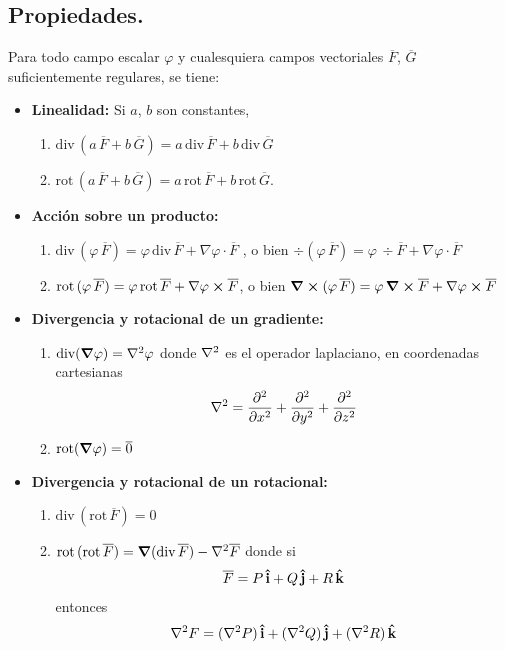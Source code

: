 \documentclass[hidelinks,12pt]{article}
\begin{document}
\subsection{Propiedades.}
Para todo campo escalar $\varphi$ y cualesquiera campos vectoriales $\overline{F}$, $\overline{G}$ suficientemente regulares, se tiene:
\begin{itemize}
\item \textbf{Linealidad:} Si $a$, $b$ son constantes,
\begin{enumerate}[label=(\roman*)]
\item  $\text{div} \, (a \, \overline{F} + b \, \overline{G}) = a \, \text{div} \, \overline{F} + b \, \text{div} \, \overline{G}$
\item $\text{rot} \, (a \, \overline{F} + b \, \overline{G}) = a \, \text{rot} \, \overline{F} + b \, \text{rot}  \, \overline{G}.$
\end{enumerate}
\item \textbf{Acción sobre un producto:}
\begin{enumerate}[label=(\roman*)]
\item  $\text{div} \, (\varphi \, \overline{F}) = \varphi \,  \text{div} \, \overline{F} + \nabla \varphi \cdot \overline{F}$ , o bien $\div{(\varphi \, \overline{F} )} = \varphi \, \div{\overline{F}} +  \nabla \varphi \cdot \overline{F}$
\item $\text{rot} \, (\varphi \, \overline{F}) = \varphi \, \text{rot} \, \overline{F} + \nabla \varphi \cp \overline{F}$, o bien $\curl{(\varphi \, \overline{F})} = \varphi \, \curl{\overline{F}} + \nabla \varphi \cp \overline{F}$
\end{enumerate}
\item \textbf{Divergencia y rotacional de un gradiente:}
\begin{enumerate}[label=(\roman*)]
\item $\text{div} (\gradient{\varphi}) = \laplacian{\varphi}$ donde $\laplacian$ es el operador laplaciano, en coordenadas cartesianas
\begin{align*}
\laplacian = \pdv[2]{x} + \pdv[2]{y} + \pdv[2]{z} 
\end{align*}
\item $\text{rot} (\gradient{\varphi}) = \overline{0}$
\end{enumerate}
\item \textbf{Divergencia y rotacional de un rotacional:}
\begin{enumerate}[label=(\roman*)]
\item $\text{div} \, (\text{rot} \, \overline{F}) = 0$
\item $\text{rot} \, (\text{rot} \, \overline{F}) = \gradient{(\text{div} \, \overline{F})} - \laplacian{\overline{F}}$ donde si
\begin{align*}
\overline{F} = P \, \vu{i} + Q \, \vu{j} + R \, \vu{k}
\end{align*}
entonces
\begin{align*}
\laplacian{F} = (\laplacian{P}) \, \vu{i} + (\laplacian{Q}) \, \vu{j} + (\laplacian{R}) \, \vu{k}
\end{align*}
\end{enumerate}
\end{itemize}
\end{document}
